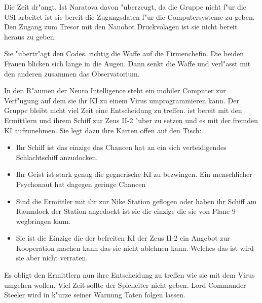 Die Zeit dr"angt. Ist Naratova davon "uberzeugt, da\3 die Gruppe nicht f"ur die USI arbeitet ist sie bereit \ml{} die Zugangsdaten f"ur die Computersysteme zu geben. Den Zugang zum Tresor mit den Nanobot Druckvolagen ist sie nicht bereit heraus zu geben.


Sie "ubertr"agt \ml{} den Codes. \xl{} richtig die Waffe auf die Firmenchefin. Die beiden Frauen blicken sich lange in die Augen. Dann senkt \xl{} die Waffe und verl"asst mit den anderen zusammen das Observatorium.

In den R"aumen der Neuro Intelligence steht \ml{} ein mobiler Computer zur Verf"ugung auf dem sie ihr KI zu einem Virus umprogrammieren kann. Der Gruppe bleibt nicht viel Zeit eine Entscheidung zu treffen. \xl{} ist bereit mit den Ermittlern und ihrem Schiff zur Zeus II-2 "uber zu setzen und es mit der fremden KI aufzunehmen. Sie legt dazu ihre Karten offen auf den Tisch:

\begin{itemize}
	\item Ihr Schiff ist das einzige das Chancen hat an ein sich verteidigendes Schlachtschiff anzudocken.
	\item Ihr Geist ist stark genug die gegnerische KI zu bezwingen. Ein menschlicher Psychonaut hat dagegen geringe Chancen
	\item Sind die Ermittler mit ihr zur Nike Station geflogen oder haben ihr Schiff am Raumdock der Station angedockt ist sie die einzige 
		die sie von Plane 9 wegbringen kann.
	\item Sie ist die Einzige die der befreiten KI der Zeus II-2 ein Angebot zur Kooperation machen kann das sie nicht ablehnen kann. 
		Welches das ist wird sie aber nicht verraten.
\end{itemize}

Es obligt den Ermittlern nun ihre Entscheidung zu treffen wie sie mit dem Virus umgehen wollen. Viel Zeit sollte der Spielleiter nicht geben. Lord Commander Steeler wird in k"urze seiner Warnung Taten folgen lassen.

\vfill
\newpage

